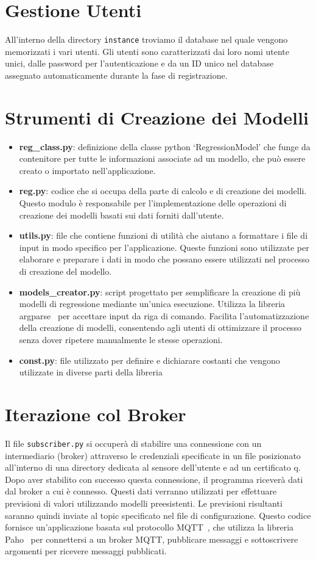 \documentclass{rapportECL}
\begin{document}
\section{Gestione Utenti}
All'interno della directory \texttt{instance} troviamo il database nel quale vengono memorizzati i vari utenti. Gli utenti
sono caratterizzati dai loro nomi utente unici, dalle password per l'autenticazione e da un ID unico nel database assegnato 
automaticamente durante la fase di registrazione.


\section{Strumenti di Creazione dei Modelli}
\begin{itemize}
  \item \textbf{reg\_class.py}: definizione della classe python `RegressionModel' che funge da contenitore per tutte le
  informazioni associate ad un modello, che può essere creato o importato nell'applicazione.
  \item \textbf{reg.py}: codice che si occupa della parte di calcolo e di creazione dei modelli. Questo modulo è responsabile 
  per l'implementazione delle operazioni di creazione dei modelli basati sui dati forniti dall'utente.
  \item \textbf{utils.py}: file che contiene funzioni di utilità che aiutano a formattare i file di input in modo specifico per l'applicazione. 
  Queste funzioni sono utilizzate per elaborare e preparare i dati in modo che possano essere utilizzati nel processo di creazione del modello.
  \item \textbf{models\_creator.py}: script progettato per semplificare la creazione di più modelli di regressione mediante un'unica esecuzione. 
  Utilizza la libreria argparse~\cite{argparse} per accettare input da riga di comando.  Facilita l'automatizzazione della creazione di modelli, 
  consentendo agli utenti di ottimizzare il processo senza dover ripetere manualmente le stesse operazioni.
  \item \textbf{const.py}: file utilizzato per definire e dichiarare costanti che vengono utilizzate in diverse parti della libreria
\end{itemize}

\section{Iterazione col Broker}
Il file \texttt{subscriber.py} si occuperà di stabilire una connessione con un intermediario (broker) attraverso le credenziali specificate in 
un file posizionato all'interno di una directory dedicata al sensore dell'utente e ad un certificato    q. Dopo aver stabilito con successo questa connessione, il programma riceverà 
dati dal broker a cui è connesso. Questi dati verranno utilizzati per effettuare previsioni di valori utilizzando modelli preesistenti. 
Le previsioni risultanti saranno quindi inviate al topic specificato nel file di configurazione.
Questo codice fornisce un'applicazione basata sul protocollo MQTT~\cite{mqtt}, che utilizza la libreria Paho~\cite{paho} per connettersi 
a un broker MQTT, pubblicare messaggi e sottoscrivere argomenti per ricevere messaggi pubblicati.
\end{document}
